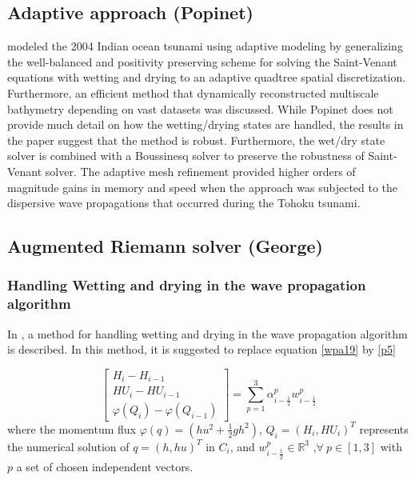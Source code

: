 \documentclass[10pt,a4paper]{article}
\begin{document}
	\subsection{Adaptive approach (Popinet)}
\citet{popinet2011quadtree} modeled the 2004 Indian ocean tsunami using adaptive modeling by generalizing the \citet{audusse2004fast} well-balanced and positivity preserving scheme for solving the Saint-Venant equations with wetting and drying to an adaptive quadtree spatial discretization.  Furthermore, an efficient method that dynamically reconstructed multiscale bathymetry depending on vast datasets was discussed.  While Popinet does not provide much detail on how the wetting/drying states are handled, the results in the paper suggest that the method is robust.  Furthermore, the wet/dry state solver is combined with a Boussinesq solver to preserve the robustness of Saint-Venant solver. The adaptive mesh refinement provided higher orders of magnitude gains in memory and speed when the approach was subjected to the dispersive wave propagations that occurred during the Tohoku tsunami.


	\subsection{Augmented Riemann solver (George)}

	\subsubsection{Handling Wetting and drying in the wave propagation algorithm}
	

	In \cite{ge:2008,ge:2011}, a method for handling wetting and drying in the wave propagation algorithm is described.  In this method, it is suggested to replace  equation	\eqref{wpa19} by  \eqref{p5}


	\begin{equation}
		\begin{bmatrix} 
			H_{i} - H_{i-1}\\ 	HU_{i} - HU_{i-1} \\  \varphi(Q_{i}) - \varphi(Q_{i-1}) 
		\end{bmatrix} = \sum_{p=1}^{3} \alpha_{i-\frac{1}{2}}^{p} w_{i-\frac{1}{2}}^{p}
		\label{p5}
	\end{equation}
	where the momentum flux $\varphi(q) = (hu^{2} + \frac{1}{2} gh^{2})$, $Q_{i} = (H_{i},HU_{i})^{T}$ represents the numerical solution of $q = (h,hu)^{T}$ in $C_{i}$, and $w_{i-\frac{1}{2}}^{p} \in \mathbb{R}^{3}$ ,$\forall ~ p \in [1,3] $ with $p$ a set of chosen independent vectors. \\
	
\end{document}
